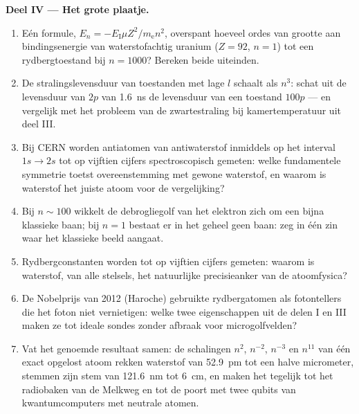 \begin{problem}
\medskip\noindent\textbf{Deel IV --- Het grote plaatje.}
\begin{enumerate}[resume]
  \item Eén formule, $E_n = -E_{\text{I}}\mu Z^2/m_{\text{e}}n^2$,
        overspant hoeveel ordes van grootte aan bindingsenergie van
        waterstofachtig uranium ($Z = 92$, $n = 1$) tot een
        rydbergtoestand bij $n = 1000$? Bereken beide uiteinden.
  \item De stralingslevensduur van toestanden met lage $l$ schaalt als
        $n^3$: schat uit de levensduur van $2p$ van \qty{1.6}{ns} de
        levensduur van een toestand $100p$ --- en vergelijk met het
        probleem van de zwartestraling bij kamertemperatuur uit deel III.
  \item Bij CERN worden antiatomen van antiwaterstof inmiddels op het
        interval $1s \to 2s$ tot op vijftien cijfers spectroscopisch
        gemeten: welke fundamentele symmetrie toetst overeenstemming met
        gewone waterstof, en waarom is waterstof het juiste atoom voor de
        vergelijking?
  \item Bij $n \sim 100$ wikkelt de debrogliegolf van het elektron zich
        om een bijna klassieke baan; bij $n = 1$ bestaat er in het geheel
        geen baan: zeg in één zin waar het klassieke beeld aangaat.
  \item Rydbergconstanten worden tot op vijftien cijfers gemeten: waarom
        is waterstof, van alle stelsels, het natuurlijke precisieanker van
        de atoomfysica?
  \item De Nobelprijs van 2012 (Haroche) gebruikte rydbergatomen als
        fotontellers die het foton niet vernietigen: welke twee
        eigenschappen uit de delen I en III maken ze tot ideale sondes
        zonder afbraak voor microgolfvelden?
  \item Vat het genoemde resultaat samen: de schalingen $n^2$, $n^{-2}$,
        $n^{-3}$ en $n^{11}$ van één exact opgelost atoom rekken waterstof
        van \qty{52.9}{pm} tot een halve micrometer, stemmen zijn stem van
        \qty{121.6}{nm} tot \qty{6}{cm}, en maken het tegelijk tot het
        radiobaken van de Melkweg en tot de poort met twee qubits van
        kwantumcomputers met neutrale atomen.
\end{enumerate}
\end{problem}
